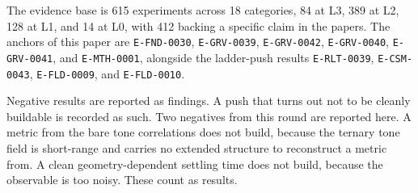 The evidence base is 615 experiments across 18 categories, 84 at L3, 389 at L2, 128 at L1, and 14 at L0, with 412 backing a specific claim in the papers. The anchors of this paper are \texttt{E-FND-0030}, \texttt{E-GRV-0039}, \texttt{E-GRV-0042}, \texttt{E-GRV-0040}, \texttt{E-GRV-0041}, and \texttt{E-MTH-0001}, alongside the ladder-push results \texttt{E-RLT-0039}, \texttt{E-CSM-0043}, \texttt{E-FLD-0009}, and \texttt{E-FLD-0010}.

Negative results are reported as findings. A push that turns out not to be cleanly buildable is recorded as such. Two negatives from this round are reported here. A metric from the bare tone correlations does not build, because the ternary tone field is short-range and carries no extended structure to reconstruct a metric from. A clean geometry-dependent settling time does not build, because the observable is too noisy. These count as results.
